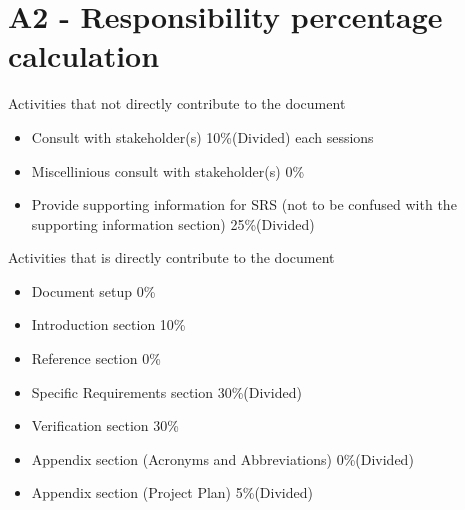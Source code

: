 \documentclass[ 10pt]{report}
\begin{document}
        \section{A2 - Responsibility percentage calculation}

        Activities that not directly contribute to the document
        \begin{itemize}
            \item Consult with stakeholder(s) 10\%(Divided) each sessions
            \item Miscellinious consult with stakeholder(s) 0\%
            \item Provide supporting information for SRS (not to be confused with the supporting information section) 25\%(Divided)
        \end{itemize}
        \indent\indent Activities that is directly contribute to the document
        \begin{itemize}
            \item Document setup 0\%
            \item Introduction section 10\%
            \item Reference section 0\%
            \item Specific Requirements section 30\%(Divided)
            \item Verification section 30\%
            \item Appendix section (Acronyms and Abbreviations) 0\%(Divided)
            \item Appendix section (Project Plan) 5\%(Divided)
        \end{itemize}
\end{document}
